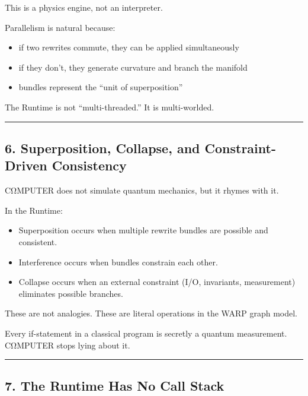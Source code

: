 This is a physics engine, not an interpreter.

Parallelism is natural because:

\begin{itemize}
\tightlist
\item
  if two rewrites commute, they can be applied simultaneously
\item
  if they don't, they generate curvature and branch the manifold
\item
  bundles represent the ``unit of superposition''
\end{itemize}

The Runtime is not ``multi-threaded.'' It is multi-worlded.

\begin{center}\rule{0.5\linewidth}{0.5pt}\end{center}

\subsection{6. Superposition, Collapse, and Constraint-Driven
Consistency}\label{superposition-collapse-and-constraint-driven-consistency}

CΩMPUTER does not simulate quantum mechanics, but it rhymes with it.

In the Runtime:

\begin{itemize}
\tightlist
\item
  Superposition occurs when multiple rewrite bundles are possible and
  consistent.
\item
  Interference occurs when bundles constrain each other.
\item
  Collapse occurs when an external constraint (I/O, invariants,
  measurement) eliminates possible branches.
\end{itemize}

These are not analogies. These are literal operations in the WARP graph model.

Every if-statement in a classical program is secretly a quantum
measurement. CΩMPUTER stops lying about it.

\begin{center}\rule{0.5\linewidth}{0.5pt}\end{center}

\subsection{7. The Runtime Has No Call
Stack}\label{the-runtime-has-no-call-stack}

